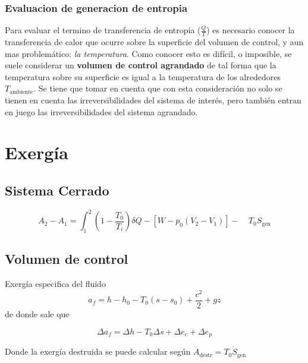 \documentclass{article}
\newcommand{\Sgen}{S_{\textrm{gen}}}
\newcommand{\dSgen}{\dot{S}_{\textrm{gen}}}
\newcommand{\dAdestr}{\dot{A}_{\mathrm{destr}}}
\begin{document}
\subsubsection{Evaluacion de generacion de entropia}

Para evaluar el termino de transferencia de entropía ($\frac{Q}{T}$) es necesario conocer la transferencia de calor que ocurre sobre la superficie del volumen de control, y aun mas problemático: \textit{la temperatura}. Como conocer esto es difícil, o imposible, se suele considerar un \textbf{volumen de control agrandado} de tal forma que la temperatura sobre su superficie es igual a la temperatura de los alrededores $T_{\mathrm{ambiente}}$. Se tiene que tomar en cuenta que con esta consideración no solo se tienen en cuenta las irreversibilidades del sistema de interés, pero también entran en juego las irreversibilidades del sistema agrandado.

\section{Exergía}
\subsection{Sistema Cerrado}

\begin{equation}
	A_2 - A_{1}=\int_{1}^{2}\left(1-\frac{T_{0}}{T_{i}}\right) \delta Q-\left[W-p_{0}\left(V_{2}-V_{1}\right)\right]-\quad T_{0} \Sgen
\end{equation}

\subsection{Volumen de control}
Exergía especifica del fluido
\[
a_f = h-h_{0}-T_{0}\left(s-s_{0}\right)+\frac{c^{2}}{2}+g z
\]
de donde sale que 

\begin{equation}
	\Delta a_f = \Delta h - T_0 \Delta s + \Delta e_c + \Delta e_p
\end{equation}

Donde la exergía destruida se puede calcular según $\dAdestr = T_0 \dSgen $
\end{document}
